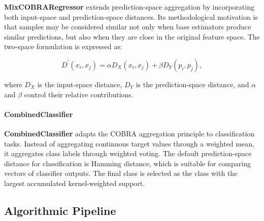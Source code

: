 \textbf{MixCOBRARegressor} extends prediction-space aggregation by incorporating both input-space and prediction-space distances. Its methodological motivation is that samples may be considered similar not only when base estimators produce similar predictions, but also when they are close in the original feature space. The two-space formulation is expressed as:

\[
    D^{\prime}(x_i, x_j) = \alpha D_X(x_i, x_j) + \beta D_Y(p_i, p_j),
\]

where $D_X$ is the input-space distance, $D_Y$ is the prediction-space distance, and $\alpha$ and $\beta$ control their relative contributions.

\paragraph{\textbf{CombinedClassifier}}

\textbf{CombinedClassifier} adapts the COBRA aggregation principle to classification tasks. Instead of aggregating continuous target values through a weighted mean, it aggregates class labels through weighted voting. The default prediction-space distance for classification is Hamming distance, which is suitable for comparing vectors of classifier outputs. The final class is selected as the class with the largest accumulated kernel-weighted support.

\subsection{Algorithmic Pipeline}

